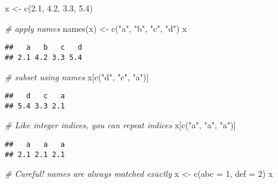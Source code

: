 \documentclass[
]{book}
\newenvironment{Shaded}{\begin{snugshade}}{\end{snugshade}}
\newcommand{\AttributeTok}[1]{\textcolor[rgb]{0.77,0.63,0.00}{#1}}
\newcommand{\CommentTok}[1]{\textcolor[rgb]{0.56,0.35,0.01}{\textit{#1}}}
\newcommand{\DecValTok}[1]{\textcolor[rgb]{0.00,0.00,0.81}{#1}}
\newcommand{\FloatTok}[1]{\textcolor[rgb]{0.00,0.00,0.81}{#1}}
\newcommand{\FunctionTok}[1]{\textcolor[rgb]{0.00,0.00,0.00}{#1}}
\newcommand{\NormalTok}[1]{#1}
\newcommand{\OtherTok}[1]{\textcolor[rgb]{0.56,0.35,0.01}{#1}}
\newcommand{\StringTok}[1]{\textcolor[rgb]{0.31,0.60,0.02}{#1}}
\begin{document}
\begin{Shaded}
\begin{Highlighting}[]
\NormalTok{x }\OtherTok{\textless{}{-}} \FunctionTok{c}\NormalTok{(}\FloatTok{2.1}\NormalTok{, }\FloatTok{4.2}\NormalTok{, }\FloatTok{3.3}\NormalTok{, }\FloatTok{5.4}\NormalTok{)}

\CommentTok{\# apply names}
\FunctionTok{names}\NormalTok{(x) }\OtherTok{\textless{}{-}} \FunctionTok{c}\NormalTok{(}\StringTok{"a"}\NormalTok{, }\StringTok{"b"}\NormalTok{, }\StringTok{"c"}\NormalTok{, }\StringTok{"d"}\NormalTok{)}
\NormalTok{x}
\end{Highlighting}
\end{Shaded}

\begin{verbatim}
##   a   b   c   d 
## 2.1 4.2 3.3 5.4
\end{verbatim}

\begin{Shaded}
\begin{Highlighting}[]
\CommentTok{\# subset using names}
\NormalTok{x[}\FunctionTok{c}\NormalTok{(}\StringTok{"d"}\NormalTok{, }\StringTok{"c"}\NormalTok{, }\StringTok{"a"}\NormalTok{)]}
\end{Highlighting}
\end{Shaded}

\begin{verbatim}
##   d   c   a 
## 5.4 3.3 2.1
\end{verbatim}

\begin{Shaded}
\begin{Highlighting}[]
\CommentTok{\# Like integer indices, you can repeat indices}
\NormalTok{x[}\FunctionTok{c}\NormalTok{(}\StringTok{"a"}\NormalTok{, }\StringTok{"a"}\NormalTok{, }\StringTok{"a"}\NormalTok{)]}
\end{Highlighting}
\end{Shaded}

\begin{verbatim}
##   a   a   a 
## 2.1 2.1 2.1
\end{verbatim}

\begin{Shaded}
\begin{Highlighting}[]
\CommentTok{\# Careful! names are always matched exactly}
\NormalTok{x }\OtherTok{\textless{}{-}} \FunctionTok{c}\NormalTok{(}\AttributeTok{abc =} \DecValTok{1}\NormalTok{, }\AttributeTok{def =} \DecValTok{2}\NormalTok{)}
\NormalTok{x}
\end{Highlighting}
\end{Shaded}
\end{document}
